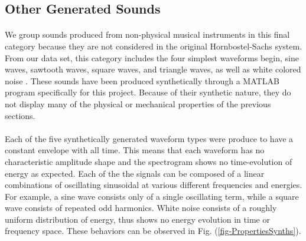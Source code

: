 \documentclass[12pt,letterpaper]{article}
\begin{document}

\subsection{Other Generated Sounds}
\label{subsec-Generated}

\paragraph*{}We group sounds produced from non-physical musical instruments in this final category because they are not considered in the original Hornbostel-Sachs system. From our data set, this category includes the four simplest waveforms begin, sine waves, sawtooth waves, square waves, and triangle waves, as well as white colored noise \cite{White}. These sounds have been produced synthetically through a MATLAB program specifically for this project. Because of their synthetic nature, they do not display many of the physical or mechanical properties of the previous sections.

\paragraph*{}Each of the five synthetically generated waveform types were produce to have a constant envelope with all time. This means that each waveform has no characteristic amplitude shape and the spectrogram shows no time-evolution of energy as expected. Each of the the signals can be composed of a linear combinations of oscillating sinusoidal at various different frequencies and energies. For example, a sine wave consists only of a single oscillating term, while a square wave consists of repeated odd harmonics. White noise consists of a roughly uniform distribution of energy, thus shows no energy evolution in time or frequency space. These behaviors can be observed in Fig. (\ref{fig-PropertiesSynths}).
\end{document}
